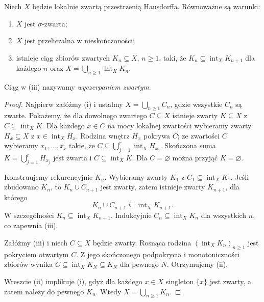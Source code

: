 \begin{twierdzenie}
\label{thm:topog-lokalna-wyczerpanie}
Niech $X$ będzie lokalnie zwartą przestrzenią
Hausdorffa. Równoważne są warunki:
\begin{enumerate}[label=(\roman*)]
\item $X$ jest $\sigma$-zwarta;
\item $X$ jest przeliczalna w nieskończoności;
\item istnieje ciąg zbiorów zwartych
      $K_n\subseteq X$, $n\ge1$, taki, że
      $K_n\subseteq\operatorname{int}_X K_{n+1}$
      dla każdego $n$ oraz
      $X=\bigcup_{n\ge1}\operatorname{int}_X K_n$.
\end{enumerate}
Ciąg w (iii) nazywamy \emph{wyczerpaniem zwartym}.
\end{twierdzenie}
\begin{proof}
Najpierw załóżmy (i) i ustalmy
$X=\bigcup_{n\ge1}C_n$, gdzie
wszystkie $C_n$ są zwarte.
Pokażemy, że dla dowolnego zwartego
$C\subseteq X$ istnieje zwarty $K\subseteq X$
z $C\subseteq\operatorname{int}_X K$.
Dla każdego $x\in C$ na mocy lokalnej
zwartości wybieramy zwarty $H_x\subseteq X$
z $x\in\operatorname{int}_X H_x$.
Rodzina wnętrz $H_x$ pokrywa $C$;
ze zwartości $C$ wybieramy
$x_1,\ldots,x_r$ takie, że
$C\subseteq\bigcup_{j=1}^r
\operatorname{int}_XH_{x_j}$.
Skończona suma
$K=\bigcup_{j=1}^rH_{x_j}$
jest zwarta i
$C\subseteq\operatorname{int}_X K$.
Dla $C=\varnothing$ można przyjąć
$K=\varnothing$.

Konstruujemy rekurencyjnie $K_n$.
Wybieramy zwarty $K_1$ z
$C_1\subseteq\operatorname{int}_X K_1$.
Jeśli zbudowano $K_n$, to
$K_n\cup C_{n+1}$ jest zwarty,
zatem istnieje zwarty $K_{n+1}$,
dla którego
\[
K_n\cup C_{n+1}
\subseteq\operatorname{int}_X K_{n+1}.
\]
W szczególności
$K_n\subseteq\operatorname{int}_X K_{n+1}$.
Indukcyjnie $C_n\subseteq
\operatorname{int}_X K_n$ dla wszystkich $n$,
co zapewnia (iii).

Załóżmy (iii) i niech $C\subseteq X$
będzie zwarty. Rosnąca rodzina
$(\operatorname{int}_XK_n)_{n\ge1}$
jest pokryciem otwartym $C$.
Z jego skończonego podpokrycia
i monotoniczności zbiorów wynika
$C\subseteq\operatorname{int}_X K_N
\subseteq K_N$ dla pewnego $N$.
Otrzymujemy (ii).

Wreszcie (ii) implikuje (i),
gdyż dla każdego $x\in X$ singleton
$\{x\}$ jest zwarty, a zatem należy
do pewnego $K_n$. Wtedy
$X=\bigcup_{n\ge1}K_n$.
\end{proof}

